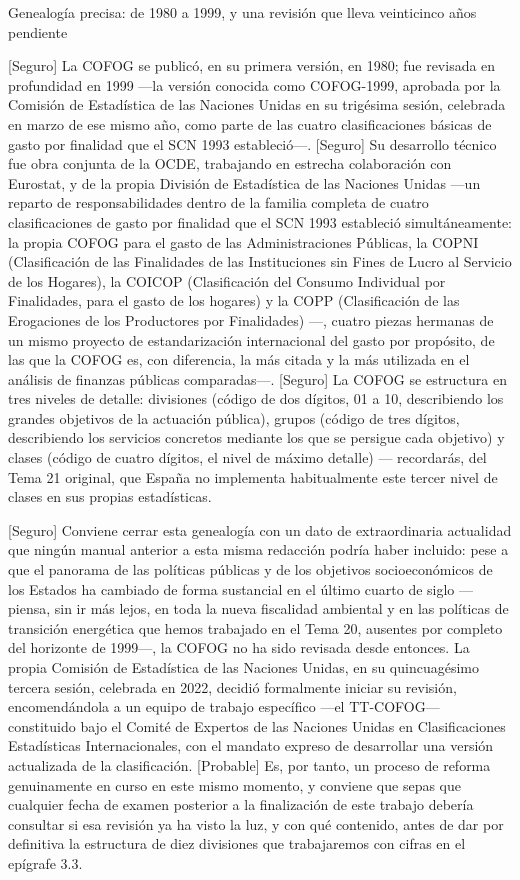 \documentclass[10pt,a4paper]{article}
\begin{document}
Genealogía precisa: de 1980 a 1999, y una revisión que lleva veinticinco años pendiente

[Seguro] La COFOG se publicó, en su primera versión, en 1980; fue revisada en profundidad en 1999 —la versión conocida como COFOG-1999, aprobada por la Comisión de Estadística de las Naciones Unidas en su trigésima sesión, celebrada en marzo de ese mismo año, como parte de las cuatro clasificaciones básicas de gasto por finalidad que el SCN 1993 estableció—. [Seguro] Su desarrollo técnico fue obra conjunta de la OCDE, trabajando en estrecha colaboración con Eurostat, y de la propia División de Estadística de las Naciones Unidas —un reparto de responsabilidades dentro de la familia completa de cuatro clasificaciones de gasto por finalidad que el SCN 1993 estableció simultáneamente: la propia COFOG para el gasto de las Administraciones Públicas, la COPNI (Clasificación de las Finalidades de las Instituciones sin Fines de Lucro al Servicio de los Hogares), la COICOP (Clasificación del Consumo Individual por Finalidades, para el gasto de los hogares) y la COPP (Clasificación de las Erogaciones de los Productores por Finalidades) —, cuatro piezas hermanas de un mismo proyecto de estandarización internacional del gasto por propósito, de las que la COFOG es, con diferencia, la más citada y la más utilizada en el análisis de finanzas públicas comparadas—. [Seguro] La COFOG se estructura en tres niveles de detalle: divisiones (código de dos dígitos, 01 a 10, describiendo los grandes objetivos de la actuación pública), grupos (código de tres dígitos, describiendo los servicios concretos mediante los que se persigue cada objetivo) y clases (código de cuatro dígitos, el nivel de máximo detalle) — recordarás, del Tema 21 original, que España no implementa habitualmente este tercer nivel de clases en sus propias estadísticas.

[Seguro] Conviene cerrar esta genealogía con un dato de extraordinaria actualidad que ningún manual anterior a esta misma redacción podría haber incluido: pese a que el panorama de las políticas públicas y de los objetivos socioeconómicos de los Estados ha cambiado de forma sustancial en el último cuarto de siglo —piensa, sin ir más lejos, en toda la nueva fiscalidad ambiental y en las políticas de transición energética que hemos trabajado en el Tema 20, ausentes por completo del horizonte de 1999—, la COFOG no ha sido revisada desde entonces. La propia Comisión de Estadística de las Naciones Unidas, en su quincuagésimo tercera sesión, celebrada en 2022, decidió formalmente iniciar su revisión, encomendándola a un equipo de trabajo específico —el TT-COFOG— constituido bajo el Comité de Expertos de las Naciones Unidas en Clasificaciones Estadísticas Internacionales, con el mandato expreso de desarrollar una versión actualizada de la clasificación. [Probable] Es, por tanto, un proceso de reforma genuinamente en curso en este mismo momento, y conviene que sepas que cualquier fecha de examen posterior a la finalización de este trabajo debería consultar si esa revisión ya ha visto la luz, y con qué contenido, antes de dar por definitiva la estructura de diez divisiones que trabajaremos con cifras en el epígrafe 3.3.
\end{document}
